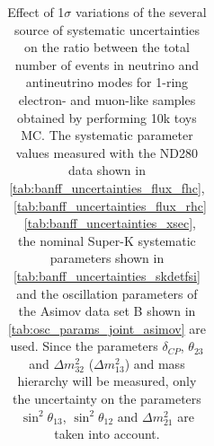 \begin{table}
\begin{tabular}{| c || c | c || c | c |}
\hline

\end{tabular}
\caption{
 Effect of 1$\sigma$ variations of the several source of systematic uncertainties 
 on the ratio between the
 total number of events in neutrino and antineutrino modes
 for 1-ring electron- and muon-like samples
 obtained by performing 10k toys MC.
 The systematic parameter values measured with the ND280 data 
shown in 
\cref{tab:banff_uncertainties_flux_fhc},
~\ref{tab:banff_uncertainties_flux_rhc}
~\ref{tab:banff_uncertainties_xsec},
the nominal Super-K systematic parameters shown in \cref{tab:banff_uncertainties_skdetfsi}
and the oscillation parameters of the Asimov data set B shown in \cref{tab:osc_params_joint_asimov}
are used.
Since the parameters $\delta_{CP}$, $\theta_{23}$ and $\Delta m^2_{32}$ ($\Delta m^2_{13}$) and mass hierarchy
will be measured,
only the uncertainty on the parameters 
$\sin^2 \theta_{13}$,
$\sin^2 \theta_{12}$
and 
$\Delta m^2_{21}$ 
are taken into account.
}             
\label{tab:ratio_systematic_table_summary_asimov_B_Run17c}                                                                                                                                                                             
\end{table}

